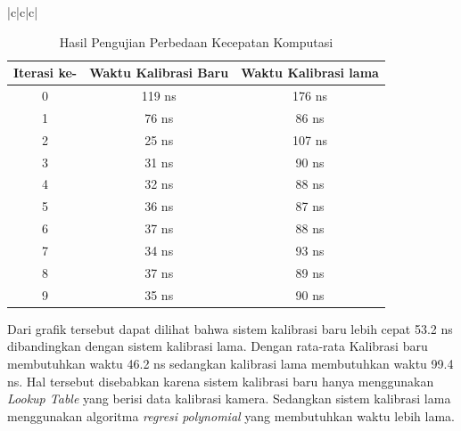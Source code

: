 \begin{table}{|c|c|c|}
  \caption{Hasil Pengujian Perbedaan Kecepatan Komputasi}
\begin{center}
  

\begin{tabular}{|c|c|c|}
  \hline
  \rowcolor[HTML]{C0C0C0}
  \textbf{Iterasi ke-} & \textbf{Waktu Kalibrasi Baru} & \textbf{Waktu Kalibrasi lama} \\
  \hline
  0            & 119 ns                & 176 ns            \\
  1           & 76 ns                & 86 ns            \\
  2           & 25 ns                & 107 ns            \\
  3           & 31 ns                & 90 ns           \\
  4           & 32 ns                & 88 ns           \\
  5           & 36 ns                & 87 ns           \\
  6           & 37 ns                & 88 ns           \\
  7           & 34 ns                & 93 ns           \\
  8           & 37 ns                & 89 ns           \\
  9           & 35 ns                & 90 ns           \\
  \hline
\end{tabular}
\end{center}
\end{table}

Dari grafik tersebut dapat dilihat bahwa sistem kalibrasi baru lebih cepat 53.2 ns dibandingkan dengan sistem kalibrasi lama. Dengan rata-rata Kalibrasi baru membutuhkan waktu 46.2 ns sedangkan kalibrasi lama membutuhkan waktu 99.4 ns. Hal tersebut disebabkan karena sistem kalibrasi baru hanya menggunakan \emph{Lookup Table} yang berisi data kalibrasi kamera. Sedangkan sistem kalibrasi lama menggunakan algoritma \emph{regresi polynomial} yang membutuhkan waktu lebih lama.